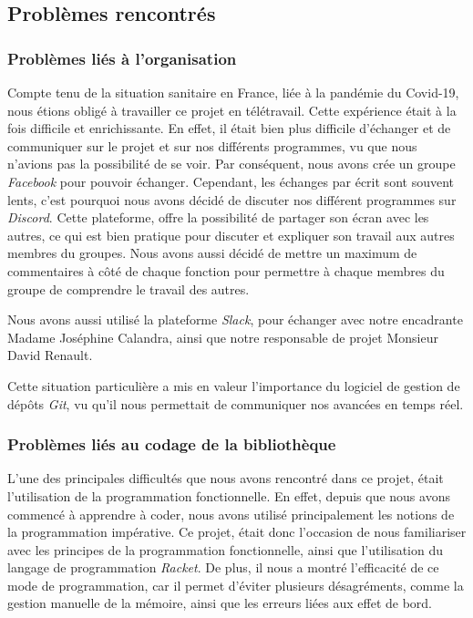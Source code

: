 \documentclass[a4paper,10pt]{article}
\begin{document}
\subsection{Problèmes rencontrés}

\subsubsection{Problèmes liés à l'organisation}
Compte tenu de la situation sanitaire en France, liée à la pandémie du Covid-19, nous étions obligé à travailler ce projet en télétravail. Cette expérience était à la fois difficile et enrichissante. En effet, il était bien plus difficile d’échanger et de communiquer sur le projet et sur nos différents programmes, vu que nous n'avions pas la possibilité de se voir. Par conséquent, nous avons crée un groupe \textit{Facebook} pour pouvoir échanger. Cependant, les échanges par écrit sont souvent lents, c'est pourquoi nous avons décidé de discuter nos différent programmes sur \textit{Discord}. Cette plateforme, offre la possibilité de partager son écran avec les autres, ce qui est bien pratique pour discuter et expliquer son travail aux autres membres du groupes. Nous avons aussi décidé de mettre un maximum de commentaires à côté de chaque fonction pour permettre à chaque membres du groupe de comprendre le travail des autres.
\newline

Nous avons aussi utilisé la plateforme \textit{Slack}, pour échanger avec notre encadrante Madame Joséphine Calandra, ainsi que notre responsable de projet Monsieur David Renault.
\newline

Cette situation particulière a mis en valeur l'importance du logiciel de gestion de dépôts \textit{Git}, vu qu'il nous permettait de communiquer nos avancées en temps réel.
\subsubsection{Problèmes liés au codage de la bibliothèque}

L'une des principales difficultés que nous avons rencontré dans ce projet, était l'utilisation de la programmation fonctionnelle. En effet, depuis que nous avons commencé à apprendre à coder, nous avons utilisé principalement les notions de la programmation impérative. Ce projet, était donc l'occasion de nous familiariser avec les principes de la programmation fonctionnelle, ainsi que l'utilisation du langage de programmation \textit{Racket}. De plus, il nous a montré l'efficacité de ce mode de programmation, car il permet d'éviter plusieurs désagréments, comme la gestion manuelle de la mémoire, ainsi que les erreurs liées aux effet de bord.
\end{document}
